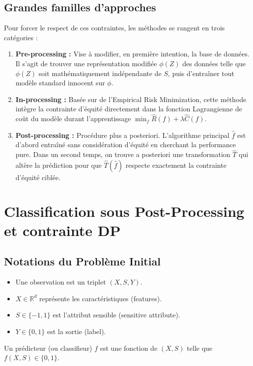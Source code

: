 \subsection{Grandes familles d'approches}
Pour forcer le respect de ces contraintes, les méthodes se rangent en trois catégories :
\begin{enumerate}
    \item \textbf{Pre-processing :} Vise à modifier, en première intention, la base de données. Il s'agit de trouver une représentation modifiée $\phi(Z)$ des données telle que $\phi(Z)$ soit mathématiquement indépendante de $S$, puis d'entraîner tout modèle standard innocent sur $\phi$.
    \item \textbf{In-processing :} Basée sur de l'Empirical Risk Minimization, cette méthode intègre la contrainte d'équité directement dans la fonction Lagrangienne de coût du modèle durant l'apprentissage $\min_f \hat{R}(f) + \lambda \hat{C}(f)$.
    \item \textbf{Post-processing :} Procédure plus a posteriori. L'algorithme principal $\hat{f}$ est d'abord entraîné sans considération d'équité en cherchant la performance pure. Dans un second temps, on trouve a posteriori une transformation $\hat{T}$ qui altère la prédiction pour que $\hat{T}(\hat{f})$ respecte exactement la contrainte d'équité ciblée.
\end{enumerate}

\section{Classification sous Post-Processing et contrainte DP}

\subsection{Notations du Problème Initial}
\begin{itemize}
    \item Une observation est un triplet $(X, S, Y)$.
    \item $X \in \mathbb{R}^d$ représente les caractéristiques (features).
    \item $S \in \{-1, 1\}$ est l'attribut sensible (sensitive attribute).
    \item $Y \in \{0, 1\}$ est la sortie (label).
\end{itemize}

Un prédicteur (ou classifieur) $f$ est une fonction de $(X,S)$ telle que $f(X,S) \in \{0, 1\}$.

